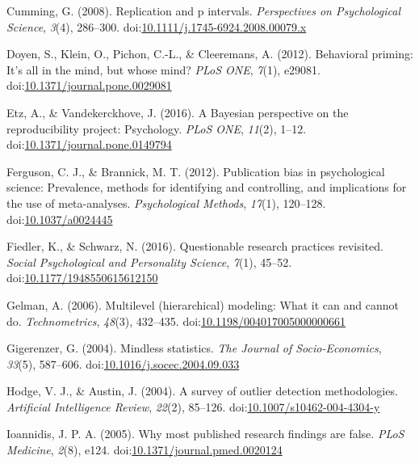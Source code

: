 \documentclass[english,,man]{apa6}
\begin{document}
\leavevmode\hypertarget{ref-Cumming2008}{}%
Cumming, G. (2008). Replication and p intervals. \emph{Perspectives on Psychological Science}, \emph{3}(4), 286--300. doi:\href{https://doi.org/10.1111/j.1745-6924.2008.00079.x}{10.1111/j.1745-6924.2008.00079.x}

\leavevmode\hypertarget{ref-Doyen2012}{}%
Doyen, S., Klein, O., Pichon, C.-L., \& Cleeremans, A. (2012). Behavioral priming: It's all in the mind, but whose mind? \emph{PLoS ONE}, \emph{7}(1), e29081. doi:\href{https://doi.org/10.1371/journal.pone.0029081}{10.1371/journal.pone.0029081}

\leavevmode\hypertarget{ref-Etz2016}{}%
Etz, A., \& Vandekerckhove, J. (2016). A Bayesian perspective on the reproducibility project: Psychology. \emph{PLoS ONE}, \emph{11}(2), 1--12. doi:\href{https://doi.org/10.1371/journal.pone.0149794}{10.1371/journal.pone.0149794}

\leavevmode\hypertarget{ref-Ferguson2012a}{}%
Ferguson, C. J., \& Brannick, M. T. (2012). Publication bias in psychological science: Prevalence, methods for identifying and controlling, and implications for the use of meta-analyses. \emph{Psychological Methods}, \emph{17}(1), 120--128. doi:\href{https://doi.org/10.1037/a0024445}{10.1037/a0024445}

\leavevmode\hypertarget{ref-Fiedler2016}{}%
Fiedler, K., \& Schwarz, N. (2016). Questionable research practices revisited. \emph{Social Psychological and Personality Science}, \emph{7}(1), 45--52. doi:\href{https://doi.org/10.1177/1948550615612150}{10.1177/1948550615612150}

\leavevmode\hypertarget{ref-Gelman2006}{}%
Gelman, A. (2006). Multilevel (hierarchical) modeling: What it can and cannot do. \emph{Technometrics}, \emph{48}(3), 432--435. doi:\href{https://doi.org/10.1198/004017005000000661}{10.1198/004017005000000661}

\leavevmode\hypertarget{ref-Gigerenzer2004}{}%
Gigerenzer, G. (2004). Mindless statistics. \emph{The Journal of Socio-Economics}, \emph{33}(5), 587--606. doi:\href{https://doi.org/10.1016/j.socec.2004.09.033}{10.1016/j.socec.2004.09.033}

\leavevmode\hypertarget{ref-Hodge2004}{}%
Hodge, V. J., \& Austin, J. (2004). A survey of outlier detection methodologies. \emph{Artificial Intelligence Review}, \emph{22}(2), 85--126. doi:\href{https://doi.org/10.1007/s10462-004-4304-y}{10.1007/s10462-004-4304-y}

\leavevmode\hypertarget{ref-Ioannidis2005}{}%
Ioannidis, J. P. A. (2005). Why most published research findings are false. \emph{PLoS Medicine}, \emph{2}(8), e124. doi:\href{https://doi.org/10.1371/journal.pmed.0020124}{10.1371/journal.pmed.0020124}
\end{document}
